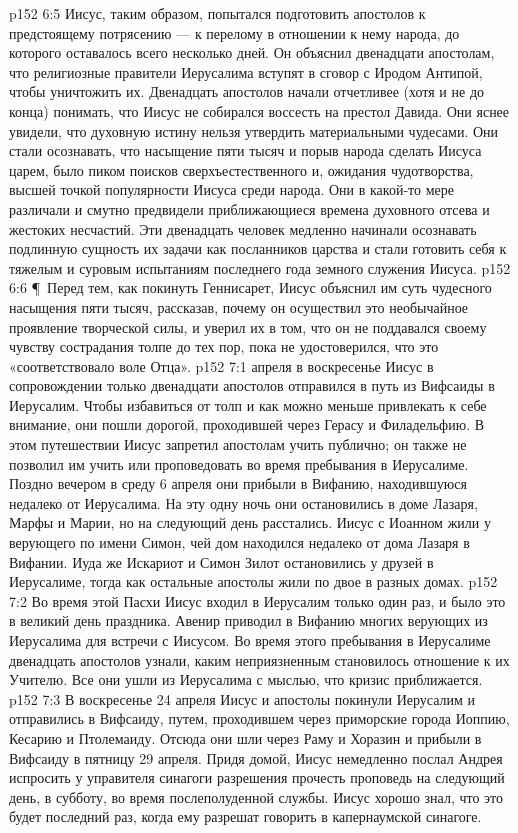 \vs p152 6:5 Иисус, таким образом, попытался подготовить апостолов к предстоящему потрясению --- к перелому в отношении к нему народа, до которого оставалось всего несколько дней. Он объяснил двенадцати апостолам, что религиозные правители Иерусалима вступят в сговор с Иродом Антипой, чтобы уничтожить их. Двенадцать апостолов начали отчетливее (хотя и не до конца) понимать, что Иисус не собирался воссесть на престол Давида. Они яснее увидели, что духовную истину нельзя утвердить материальными чудесами. Они стали осознавать, что насыщение пяти тысяч и порыв народа сделать Иисуса царем, было пиком поисков сверхъестественного и, ожидания чудотворства, высшей точкой популярности Иисуса среди народа. Они в какой\hyp{}то мере различали и смутно предвидели приближающиеся времена духовного отсева и жестоких несчастий. Эти двенадцать человек медленно начинали осознавать подлинную сущность их задачи как посланников царства и стали готовить себя к тяжелым и суровым испытаниям последнего года земного служения Иисуса.
\vs p152 6:6 \P\ Перед тем, как покинуть Геннисарет, Иисус объяснил им суть чудесного насыщения пяти тысяч, рассказав, почему он осуществил это необычайное проявление творческой силы, и уверил их в том, что он не поддавался своему чувству сострадания толпе до тех пор, пока не удостоверился, что это «соответствовало воле Отца».
\vs p152 7:1 апреля в воскресенье Иисус в сопровождении только двенадцати апостолов отправился в путь из Вифсаиды в Иерусалим. Чтобы избавиться от толп и как можно меньше привлекать к себе внимание, они пошли дорогой, проходившей через Герасу и Филадельфию. В этом путешествии Иисус запретил апостолам учить публично; он также не позволил им учить или проповедовать во время пребывания в Иерусалиме. Поздно вечером в среду 6 апреля они прибыли в Вифанию, находившуюся недалеко от Иерусалима. На эту одну ночь они остановились в доме Лазаря, Марфы и Марии, но на следующий день расстались. Иисус с Иоанном жили у верующего по имени Симон, чей дом находился недалеко от дома Лазаря в Вифании. Иуда же Искариот и Симон Зилот остановились у друзей в Иерусалиме, тогда как остальные апостолы жили по двое в разных домах.
\vs p152 7:2 Во время этой Пасхи Иисус входил в Иерусалим только один раз, и было это в великий день праздника. Авенир приводил в Вифанию многих верующих из Иерусалима для встречи с Иисусом. Во время этого пребывания в Иерусалиме двенадцать апостолов узнали, каким неприязненным становилось отношение к их Учителю. Все они ушли из Иерусалима с мыслью, что кризис приближается.
\vs p152 7:3 В воскресенье 24 апреля Иисус и апостолы покинули Иерусалим и отправились в Вифсаиду, путем, проходившем через приморские города Иоппию, Кесарию и Птолемаиду. Отсюда они шли через Раму и Хоразин и прибыли в Вифсаиду в пятницу 29 апреля. Придя домой, Иисус немедленно послал Андрея испросить у управителя синагоги разрешения прочесть проповедь на следующий день, в субботу, во время послеполуденной службы. Иисус хорошо знал, что это будет последний раз, когда ему разрешат говорить в капернаумской синагоге.
